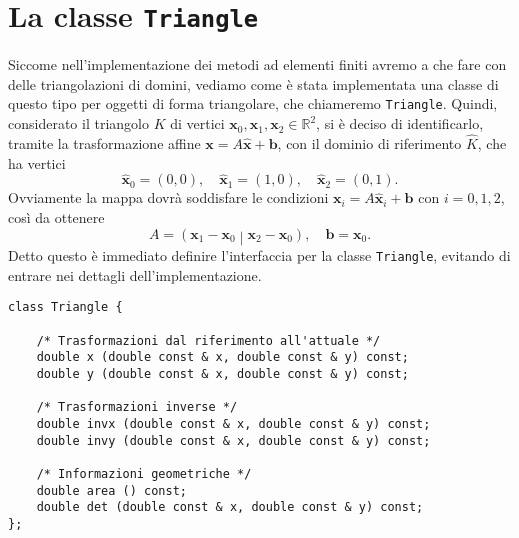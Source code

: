 \documentclass[a4paper,10pt,twoside]{amsart}
\theoremstyle{remark}
\theoremstyle{definition}
\newcommand{\R}{\mathbb R}
\renewcommand{\vector}{\mathbf}
\renewcommand{\tt}{\texttt}
\begin{document}
\section{La classe \tt{Triangle}}

Siccome nell'implementazione dei metodi ad elementi finiti avremo a che fare con delle triangolazioni di domini, vediamo come è stata implementata una classe di questo tipo per oggetti di forma triangolare, che chiameremo \tt{Triangle}. Quindi, considerato il triangolo $K$ di vertici $\vector{x}_0,\vector{x}_1,\vector{x}_2\in\R^2$, si è deciso di identificarlo, tramite la trasformazione affine $\vector{x}=A\hat{\vector{x}}+\vector{b}$, con il dominio di riferimento $\hat{K}$, che ha vertici
\[
\hat{\vector{x}}_0=(0,0),\quad
\hat{\vector{x}}_1=(1,0),\quad
\hat{\vector{x}}_2=(0,1).
\]
Ovviamente la mappa dovrà soddisfare le condizioni $\vector{x}_i=A\hat{\vector{x}}_i+\vector{b}$ con $i=0,1,2$, così da ottenere
\[
A = \left( \vector{x}_1 - \vector{x}_0 \middle| \vector{x}_2 - \vector{x}_0 \right), \quad
\vector{b} = \vector{x}_0.
\]
Detto questo è immediato definire l'interfaccia per la classe \tt{Triangle}, evitando di entrare nei dettagli dell'implementazione.
\begin{lstlisting}
class Triangle {
	
	/* Trasformazioni dal riferimento all'attuale */
	double x (double const & x, double const & y) const;
	double y (double const & x, double const & y) const;
	
	/* Trasformazioni inverse */
	double invx (double const & x, double const & y) const;
	double invy (double const & x, double const & y) const;
	
	/* Informazioni geometriche */
	double area () const;
	double det (double const & x, double const & y) const;
};
\end{lstlisting}
\end{document}
